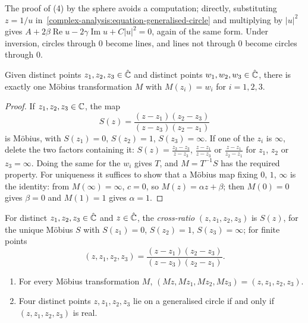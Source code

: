 The proof of (4) by the sphere avoids a computation; directly, substituting $z = 1/u$ in~\eqref{complex-analysis:equation-generalised-circle} and multiplying by $|u|^2$ gives
$A + 2\beta\operatorname{Re}u - 2\gamma\operatorname{Im}u + C|u|^2 = 0$, again of the same form. Under inversion, circles through $0$ become lines, and lines not through $0$ become circles through $0$.

\begin{theorem}\label{complex-analysis:theorem-three-points}
Given distinct points $z_1, z_2, z_3 \in \hat{\mathbb{C}}$ and distinct points $w_1, w_2, w_3 \in \hat{\mathbb{C}}$, there is exactly one M\"obius transformation $M$ with $M(z_i) = w_i$ for $i = 1, 2, 3$.
\end{theorem}

\begin{proof}
If $z_1, z_2, z_3 \in \mathbb{C}$, the map
\[
S(z) = \frac{(z - z_1)(z_2 - z_3)}{(z - z_3)(z_2 - z_1)}
\]
is M\"obius, with $S(z_1) = 0$, $S(z_2) = 1$, $S(z_3) = \infty$. If one of the $z_i$ is $\infty$, delete the two factors containing it: $S(z) = \frac{z_2 - z_3}{z - z_3}$, $\frac{z - z_1}{z - z_3}$ or $\frac{z - z_1}{z_2 - z_1}$ for
$z_1$, $z_2$ or $z_3 = \infty$. Doing the same for the $w_i$ gives $T$, and $M = T^{-1}S$ has the required property. For uniqueness it suffices to show that a M\"obius map fixing $0$, $1$, $\infty$ is the identity: from
$M(\infty) = \infty$, $c = 0$, so $M(z) = \alpha z + \beta$; then $M(0) = 0$ gives $\beta = 0$ and $M(1) = 1$ gives $\alpha = 1$.
\end{proof}

\begin{definition}\label{complex-analysis:definition-cross-ratio}
For distinct $z_1, z_2, z_3 \in \hat{\mathbb{C}}$ and $z \in \hat{\mathbb{C}}$, the \emph{cross-ratio} $(z, z_1, z_2, z_3)$ is $S(z)$, for the unique M\"obius $S$ with $S(z_1) = 0$, $S(z_2) = 1$, $S(z_3) = \infty$; for finite points
\[
(z, z_1, z_2, z_3) = \frac{(z - z_1)(z_2 - z_3)}{(z - z_3)(z_2 - z_1)}.
\]
\end{definition}

\begin{corollary}\label{complex-analysis:corollary-cross-ratio}
\begin{enumerate}
\item For every M\"obius transformation $M$, $(Mz, Mz_1, Mz_2, Mz_3) = (z, z_1, z_2, z_3)$.
\item Four distinct points $z, z_1, z_2, z_3$ lie on a generalised circle if and only if $(z, z_1, z_2, z_3)$ is real.
\end{enumerate}
\end{corollary}

